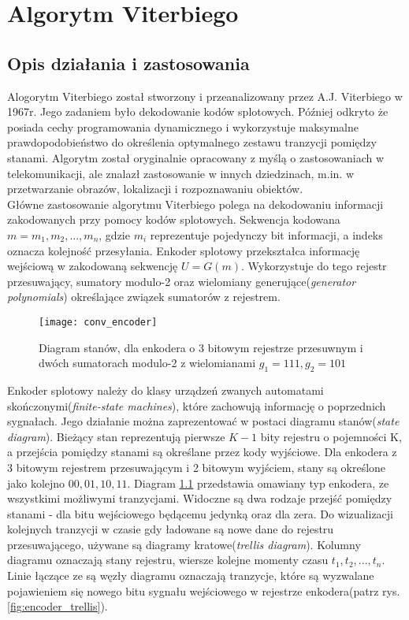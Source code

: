 \documentclass[document.tex]{subfiles}
\begin{document}
\chapter{Algorytm Viterbiego}\label{viterbi_chapter}
\section{Opis działania i zastosowania}
\indent Alogorytm Viterbiego został stworzony i przeanalizowany przez A.J. Viterbiego w 1967r. Jego zadaniem było dekodowanie kodów splotowych. Później odkryto że posiada cechy programowania dynamicznego i wykorzystuje maksymalne prawdopodobieństwo do określenia optymalnego zestawu tranzycji pomiędzy stanami. Algorytm został oryginalnie opracowany z myślą o zastosowaniach w telekomunikacji, ale znalazł zastosowanie w innych dziedzinach, m.in. w przetwarzanie obrazów, lokalizacji i rozpoznawaniu obiektów.\cite{viterbi_tutorial}
\\
\indent Główne zastosowanie algorytmu Viterbiego polega na
dekodowaniu informacji zakodowanych przy pomocy kodów splotowych. Sekwencja kodowana $m = m_1, m_2,...,m_n$, gdzie 
$m_i$ reprezentuje pojedynczy bit informacji, a indeks oznacza kolejność przesyłania. Enkoder splotowy przekształca informację wejściową w zakodowaną sekwencję $U = G(m)$.
Wykorzystuje do tego rejestr przesuwający, sumatory modulo-2 oraz wielomiany generujące(\textit{generator polynomials}) określające związek sumatorów z rejestrem.\cite{Comm_Sklar}\cite{viterbi_tutorial}

\begin{figure}[h]
\texttt{[image: conv\_encoder]}
\caption{Diagram stanów, dla enkodera o 3 bitowym rejestrze przesuwnym 
i dwóch sumatorach modulo-2 z wielomianami $g_1 = 111, g_2 = 101$ \protect\cite{Comm_Sklar}}
\label{fig:encoder}
\end{figure}

\clearpage
\indent Enkoder splotowy należy do klasy urządzeń zwanych automatami skończonymi(\textit{finite-state machines}), które zachowują informację o poprzednich sygnałach.
Jego działanie można zaprezentować w postaci diagramu stanów(\textit{state diagram}). Bieżący stan reprezentują pierwsze $K - 1$ bity rejestru o pojemności K, a przejścia pomiędzy stanami są określane przez kody wyjściowe.
Dla enkodera z 3 bitowym rejestrem przesuwającym i 2 bitowym wyjściem, stany są określone jako kolejno
$00, 01, 10, 11$. Diagram \ref{fig:encoder} przedstawia omawiany typ enkodera, ze wszystkimi możliwymi 
tranzycjami. Widoczne są dwa rodzaje przejść pomiędzy stanami - dla bitu wejściowego będącemu jedynką oraz dla zera. Do wizualizacji kolejnych tranzycji w czasie gdy ładowane są nowe dane do rejestru przesuwającego,
używane są diagramy kratowe(\textit{trellis diagram}).\cite{kody_splotowe}\cite{Comm_Sklar}\cite{viterbi_tutorial}
Kolumny diagramu oznaczają stany rejestru, wiersze kolejne momenty czasu $t_1, t_2, ..., t_n$. Linie łączące ze są węzły diagramu oznaczają tranzycje, które są wyzwalane pojawieniem się nowego bitu sygnału wejściowego w rejestrze enkodera(patrz rys. \ref{fig:encoder_trellis}).
\end{document}
